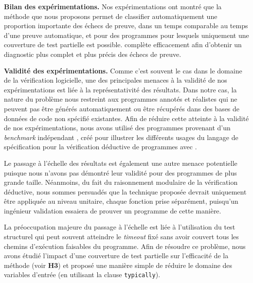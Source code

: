 \textbf{Bilan des expérimentations.}
Nos expérimentations ont montré que la méthode que nous proposons permet de
classifier automatiquement une proportion importante des échecs de preuve, dans
un temps comparable au temps d'une preuve automatique, et pour des programmes
pour lesquels uniquement une couverture de test partielle est possible.
\SWD complète efficacement \NCD afin d'obtenir un diagnostic plus complet et
plus précis des échecs de preuve.

\textbf{Validité des expérimentations.}
Comme c'est souvent le cas dans le domaine de la vérification logicielle, une
des principales menaces à la validité de nos expérimentations est liée à la
représentativité des résultats.
Dans notre cas, la nature du problème nous restreint aux programmes annotés
et réalistes qui ne peuvent pas être générés automatiquement ou être récupérés
dans des bases de données de code non spécifié existantes.
Afin de réduire cette atteinte à la validité de nos expérimentations, nous
avons utilisé des programmes provenant d'un {\em benchmark} indépendant
\cite{ACSLbyExample}, créé pour illustrer les différents usages du langage de
spécification \acsl pour la vérification déductive de programmes avec \framac.

Le passage à l'échelle des résultats est également une autre menace potentielle
puisque nous n'avons pas démontré leur validité pour des programmes de plus
grande taille.
Néanmoins, du fait du raisonnement modulaire de la vérification déductive, nous
sommes persuadés que la technique proposée devrait uniquement être appliquée au
niveau unitaire, chaque fonction prise séparément, puisqu'un ingénieur
validation essaiera de prouver un programme de cette manière.

La préoccupation majeure du passage à l'échelle est liée à l'utilisation du
test structurel qui peut souvent atteindre le {\em timeout} fixé sans avoir
couvert tous les chemins d'exécution faisables du programme.
Afin de résoudre ce problème, nous avons étudié l'impact d'une couverture de
test partielle sur l'efficacité de la méthode (voir \textbf{H3}) et proposé une
manière simple de réduire le domaine des variables d'entrée (en utilisant la
clause \lstinline'typically').

